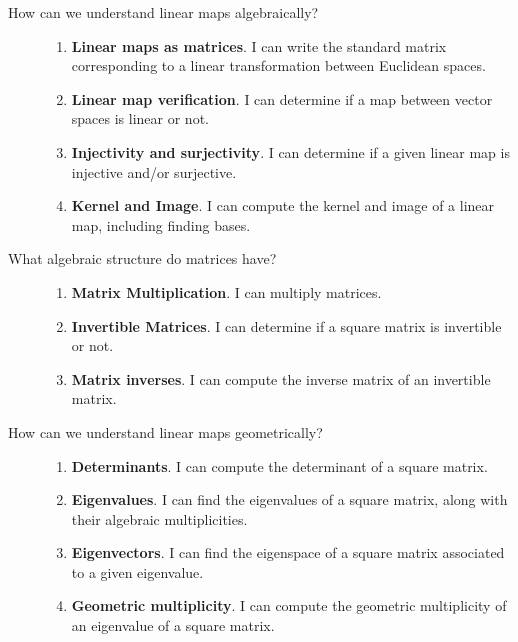 \begin{description}
\item[How can we understand linear maps algebraically?] \hfill
\begin{enumerate}
\item {\bf Linear maps as matrices}.  I can write the standard matrix corresponding to a linear transformation between Euclidean spaces.
\item {\bf Linear map verification}. I can determine if a map between vector spaces is linear or not.
\item {\bf Injectivity and surjectivity}.  I can determine if a given linear map is injective and/or surjective.
\item {\bf Kernel and Image}. I can compute the kernel and image of a linear map, including finding bases.
\end{enumerate}


\item[What algebraic structure do matrices have?] \hfill
\begin{enumerate}
\item {\bf Matrix Multiplication}. I can multiply matrices.
\item {\bf Invertible Matrices}. I can determine if a square matrix is invertible or not.
\item {\bf Matrix inverses}.  I can compute the inverse matrix of an invertible matrix.
\end{enumerate}


\item[How can we understand linear maps geometrically?] \hfill
\begin{enumerate}
\item {\bf Determinants}. I can compute the determinant of a square matrix.
\item {\bf Eigenvalues}. I can find the eigenvalues of a square matrix, along with their algebraic multiplicities.
\item {\bf Eigenvectors}. I can find the eigenspace of a square matrix associated to a given eigenvalue.
\item {\bf Geometric multiplicity}. I can compute the geometric multiplicity of an eigenvalue of a square matrix.
\end{enumerate}

\end{description}




